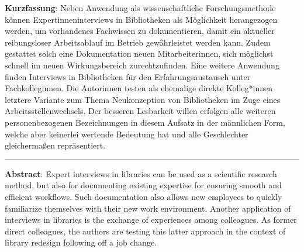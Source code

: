 \textbf{Kurzfassung}: Neben Anwendung als wissenschaftliche
Forschungsmethode können Expert\*inneninterviews in Bibliotheken als
Möglichkeit herangezogen werden, um vorhandenes Fachwissen zu
dokumentieren, damit ein aktueller reibungsloser Arbeitsablauf im
Betrieb gewährleistet werden kann. Zudem gestattet solch eine
Dokumentation neuen Mitarbeiter\*innen, sich möglichst schnell im neuen
Wirkungsbereich zurechtzufinden. Eine weitere Anwendung finden
Interviews in Bibliotheken für den Erfahrungsaustausch unter
Fachkolleg\*innen. Die Autor\*innen testen als ehemalige direkte
Kolleg*innen letztere Variante zum Thema Neukonzeption von Bibliotheken
im Zuge eines Arbeitsstellenwechsels. Der besseren Lesbarkeit willen
erfolgen alle weiteren personenbezogenen Bezeichnungen in diesem Aufsatz
in der männlichen Form, welche aber keinerlei wertende Bedeutung hat und
alle Geschlechter gleichermaßen repräsentiert.

\begin{center}\rule{0.5\linewidth}{0.5pt}\end{center}

\noindent\textbf{Abstract}: Expert interviews in libraries can be used as a
scientific research method, but also for documenting existing expertise
for ensuring smooth and efficient workflows. Such documentation also
allows new employees to quickly familiarize themselves with their new
work environment. Another application of interviews in libraries is the
exchange of experiences among colleagues. As former direct colleagues,
the authors are testing this latter approach in the context of library
redesign following off a job change.
